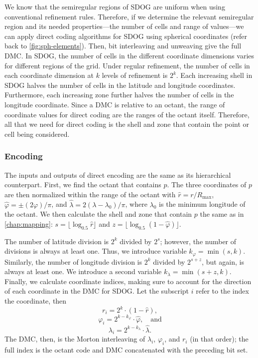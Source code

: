 We know that the semiregular regions of SDOG are uniform when using conventional refinement rules.
Therefore, if we determine the relevant semiregular region and its needed properties---the number of cells and range of values---we can apply direct coding algorithms for SDOG using spherical coordinates (refer back to \cref{fig:sph-elements}).
Then, bit interleaving and unweaving give the full DMC.
In SDOG, the number of cells in the different coordinate dimensions varies for different regions of the grid.
Under regular refinement, the number of cells in each coordinate dimension at $k$ levels of refinement is $2^k$.
Each increasing shell in SDOG halves the number of cells in the latitude and longitude coordinates.
Furthermore, each increasing zone further halves the number of cells in the longitude coordinate.
Since a DMC is relative to an octant, the range of coordinate values for direct coding are the ranges of the octant itself.
Therefore, all that we need for direct coding is the shell and zone that contain the point or cell being considered.


\subsubsection{Encoding}
The inputs and outputs of direct encoding are the same as its hierarchical counterpart.
First, we find the octant that contains $p$.
The three coordinates of $p$ are then normalized within the range of the octant with $\hat{r} = r / R_\mathrm{max}$, $\hat{\varphi} = \pm (2\varphi) / \pi$, and $\hat{\lambda} = 2 (\lambda - \lambda_0) / \pi$, where $\lambda_0$ is the minimum longitude of the octant.
We then calculate the shell and zone that contain $p$ the same as in \cref{chap:mapping}: $s = \lfloor \log_{0.5} \hat{r} \rfloor$ and $z = \lfloor \log_{0.5} ( 1 - \hat{\varphi} ) \rfloor$.


The number of latitude division is $2^k$ divided by $2^s$; however, the number of divisions is always at least one.
Thus, we introduce variable $k_\varphi = \min ( s, k )$.
Similarly, the number of longitude division is $2^k$ divided by $2^{s+z}$, but again, is always at least one.
We introduce a second variable $k_\lambda = \min ( s + z, k )$.
Finally, we calculate coordinate indices, making sure to account for the direction of each coordinate in the DMC for SDOG.
Let the subscript $i$ refer to the index the coordinate, then
%
\begin{equation*}
r_i = 2^k \cdot ( 1 - \hat{r} ),
\end{equation*}
%
\begin{equation*}
\varphi_i = 2^{k - k_\varphi} \cdot \hat{\varphi}, \quad \text{and}
\end{equation*}
%
\begin{equation*}
\lambda_i = 2^{k - k_\lambda} \cdot \hat{\lambda}.
\end{equation*}
%
The DMC, then, is the Morton interleaving of $\lambda_i$, $\varphi_i$, and $r_i$ (in that order); the full index is the octant code and DMC concatenated with the preceding bit set.


